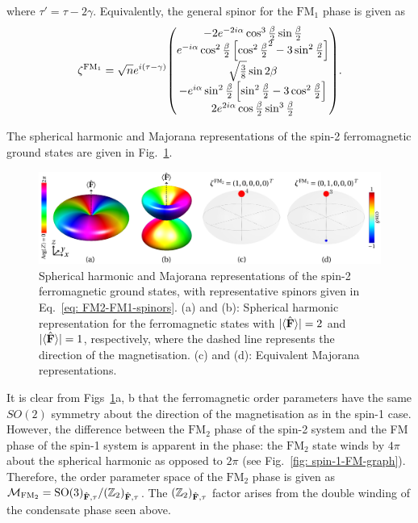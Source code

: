 where \(\tau'=\tau-2\gamma \).
Equivalently, the general spinor for the \(\text{FM}_1\) phase is given as
\begin{align}
    \zeta^{\text{FM}_1} = \sqrt{n}e^{i(\tau - \gamma)}\mqty(
        -2e^{-2i\alpha}\cos^3\frac{\beta}{2}\sin\frac{\beta}{2} \\
        e^{-i\alpha}\cos^2\frac{\beta}{2}\left[\cos^2\frac{\beta}{2}^2
            -3\sin^2\frac{\beta}{2}\right] \\
        \sqrt{\frac{3}{8}}\sin2\beta \\
        -e^{i\alpha}\sin^2\frac{\beta}{2}\left[\sin^2\frac{\beta}{2}
            -3\cos^2\frac{\beta}{2}\right] \\
        2e^{2i\alpha}\cos\frac{\beta}{2}\sin^3\frac{\beta}{2}
    ).
\end{align}

The spherical harmonic and Majorana representations of the spin-2 ferromagnetic
ground states are given in Fig.~\ref{fig: spin-2-FM-graph}.
\begin{figure}
    \centering
    \includegraphics[width=\textwidth]
    {gfx/ch-groundStateSymmetries/spin-2-FM.pdf}
    \caption{\label{fig: spin-2-FM-graph}Spherical harmonic and Majorana
    representations of the spin-2 ferromagnetic ground states, with
    representative spinors given in Eq.~\eqref{eq: FM2-FM1-spinors}.
    (a) and (b): Spherical harmonic representation for the ferromagnetic states
    with \(|\langle \hat{\vb{F}} \rangle |=2\) and \(|\langle \hat{\vb{F}} \rangle |=1\), respectively, where the dashed line
    represents the direction of the magnetisation.
    (c) and (d): Equivalent Majorana representations.}
\end{figure}
It is clear from Figs~\ref{fig: spin-2-FM-graph}a, b that the ferromagnetic
order parameters have the same \(SO(2)\) symmetry about the direction of the
magnetisation as in the spin-1 case.
However, the difference between the \(\text{FM}_2\) phase of the spin-2 system
and the FM phase of the spin-1 system is apparent in the phase: the
\(\text{FM}_2\) state winds by \(4\pi \) about the spherical harmonic as opposed
to \(2\pi \) (see Fig.~\ref{fig: spin-1-FM-graph}).
Therefore, the order parameter space of the \(\text{FM}_2\) phase is given as
\(\mathcal{M}_{\text{FM}_2} = {\text{SO}(3)}_{\hat{\vb{F}}, \tau} /
{(\mathbb{Z}_2)}_{\hat{\vb{F}}, \tau}\).
The \({(\mathbb{Z}_2)}_{\hat{\vb{F}}, \tau}\) factor arises from the double
winding of the condensate phase seen above.

